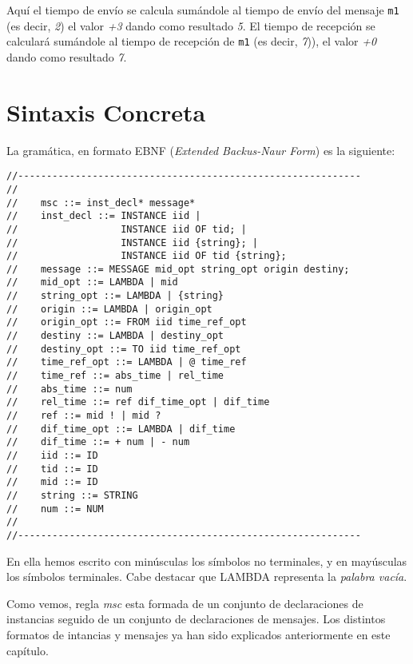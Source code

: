 \begin{itemize}

  Aquí el tiempo de envío se calcula sumándole al tiempo de envío del
  mensaje \lstinline{m1} (es decir, \textit{2}) el valor \textit{+3}
  dando como resultado \textit{5}. El tiempo de recepción se calculará
  sumándole al tiempo de recepción de \lstinline{m1} (es decir,
  \textit{7})), el valor \textit{+0} dando como resultado \textit{7}.
\end{itemize}

\section{Sintaxis Concreta}

La gramática, en formato EBNF (\emph{Extended Backus-Naur Form}) es la siguiente:
\begin{verbatim}
//------------------------------------------------------------
//    
//    msc ::= inst_decl* message*
//    inst_decl ::= INSTANCE iid |
//                  INSTANCE iid OF tid; |
//                  INSTANCE iid {string}; |
//                  INSTANCE iid OF tid {string};               
//    message ::= MESSAGE mid_opt string_opt origin destiny;
//    mid_opt ::= LAMBDA | mid
//    string_opt ::= LAMBDA | {string}
//    origin ::= LAMBDA | origin_opt
//    origin_opt ::= FROM iid time_ref_opt
//    destiny ::= LAMBDA | destiny_opt
//    destiny_opt ::= TO iid time_ref_opt
//    time_ref_opt ::= LAMBDA | @ time_ref
//    time_ref ::= abs_time | rel_time
//    abs_time ::= num
//    rel_time ::= ref dif_time_opt | dif_time
//    ref ::= mid ! | mid ?
//    dif_time_opt ::= LAMBDA | dif_time
//    dif_time ::= + num | - num
//    iid ::= ID
//    tid ::= ID
//    mid ::= ID
//    string ::= STRING
//    num ::= NUM
//
//------------------------------------------------------------
\end{verbatim}

En ella hemos escrito con minúsculas los símbolos no terminales, y en mayúsculas los símbolos terminales. Cabe destacar que LAMBDA representa la \textit{palabra vacía}.

Como vemos, regla \textit{msc} esta formada de un conjunto de declaraciones de
instancias seguido de un conjunto de declaraciones de mensajes. Los distintos
formatos de intancias y mensajes ya han sido explicados anteriormente en este
capítulo.


